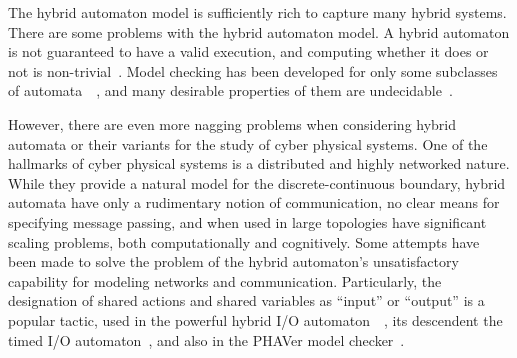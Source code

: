 The hybrid automaton model is sufficiently rich to capture many hybrid systems. 
There are some problems with the hybrid automaton model. A hybrid automaton is not guaranteed to
have a valid execution, and computing whether it does or not is non-trivial~\cite{lygeros1999existence}.
Model checking has been developed for only some subclasses of 
automata~\cite{henzinger1997hytech}~\cite{frehse2005phaver}, and many desirable
properties of them are undecidable~\cite{henzinger1998s}.

However, there are even more nagging problems when considering hybrid automata or their variants
for the study of cyber physical systems. One of the hallmarks of cyber physical systems is a
distributed and highly networked nature. While they provide a
natural model for the discrete-continuous boundary, hybrid automata have only a rudimentary
notion of communication, no clear means for specifying message passing, and when used in large
topologies have significant scaling problems, both computationally and cognitively.
Some attempts have been made to solve the problem of the hybrid automaton's unsatisfactory
capability for modeling networks and communication. Particularly, the designation of shared
actions and shared variables as ``input'' or ``output'' is a popular tactic, used in the
powerful hybrid I/O automaton~\cite{lynch1996hybrid}~\cite{lynch2001hybrid}, its descendent the
timed I/O automaton~\cite{kaynar2010theory}, and also in the PHAVer model 
checker~\cite{frehse2005phaver}.

